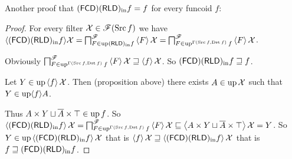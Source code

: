 Another proof that $\tofcd\torldin f=f$ for every funcoid $f$:
\begin{proof}
For every filter $\mathcal{X}\in\mathscr{F}(\Src f)$ we have $\langle\tofcd\torldin f\rangle\mathcal{X}=\bigsqcap_{F\in\up\torldin f}^{\mathscr{F}}\supfun F\mathcal{X}=\bigsqcap_{F\in\up^{\Gamma(\Src f,\Dst f)}f}^{\mathscr{F}}\supfun F\mathcal{X}$.

Obviously $\bigsqcap_{F\in\up^{\Gamma(\Src f,\Dst f)}f}^{\mathscr{F}}\supfun F\mathcal{X}\sqsupseteq\supfun f\mathcal{X}$.
So $\tofcd\torldin f\sqsupseteq f$.

Let $Y\in\up\supfun f\mathcal{X}$. Then (proposition above) there
exists $A\in\up\mathcal{X}$ such that $Y\in\up\langle f\rangle A$.

Thus $A\times Y\sqcup\overline{A}\times\top\in\up f$. So $\supfun{\tofcd\torldin f}\mathcal{X}=\bigsqcap_{F\in\up^{\Gamma(\Src f,\Dst f)}f}^{\mathscr{F}}\supfun F\mathcal{X}\sqsubseteq\supfun{A\times Y\sqcup\overline{A}\times\top}\mathcal{X}=Y$.
So $Y\in\up\supfun{\tofcd\torldin f}\mathcal{X}$ that
is $\supfun f\mathcal{X}\sqsupseteq\supfun{\tofcd\torldin f}\mathcal{X}$
that is $f\sqsupseteq\tofcd\torldin f$.\end{proof}


